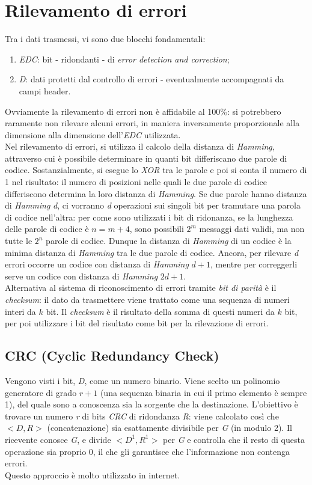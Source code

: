 \section{Rilevamento di errori}
Tra i dati trasmessi, vi sono due blocchi fondamentali:
\begin{enumerate}
	\item \textit{EDC}: bit - ridondanti - di \textit{error detection and correction};
	\item \textit{D}: dati protetti dal controllo di errori - eventualmente accompagnati da campi header.
\end{enumerate}
Ovviamente la rilevamento di errori non è affidabile al 100\%: si potrebbero raramente non rilevare alcuni errori, in maniera inversamente proporzionale alla dimensione alla dimensione dell'\textit{EDC} utilizzata. \\
Nel rilevamento di errori, si utilizza il calcolo della distanza di \textit{Hamming}, attraverso cui è possibile determinare in quanti bit differiscano due parole di codice. Sostanzialmente, si esegue lo \textit{XOR} tra le parole e poi si conta il numero di 1 nel risultato: il numero di posizioni nelle quali le due parole di codice differiscono determina la loro distanza di \textit{Hamming}. Se due parole hanno distanza di \textit{Hamming} \textit{d}, ci vorranno \textit{d} operazioni sui singoli bit per tramutare una parola di codice nell'altra: per come sono utilizzati i bit di ridonanza, se la lunghezza delle parole di codice è $n=m+4$, sono possibili $2^m$ messaggi dati validi, ma non tutte le $2^n$ parole di codice. Dunque la distanza di \textit{Hamming} di un codice è la minima distanza di \textit{Hamming} tra le due parole di codice. Ancora, per rilevare \textit{d} errori occorre un codice con distanza di \textit{Hamming} $d+1$, mentre per correggerli serve un codice con distanza di \textit{Hamming} $2d+1$. \\
Alternativa al sistema di riconoscimento di errori tramite \textit{bit di parità} è il \textit{checksum}: il dato da trasmettere viene trattato come una sequenza di numeri interi da $k$ bit. Il \textit{checksum} è il risultato della somma di questi numeri da $k$ bit, per poi utilizzare i bit del risultato come bit per la rilevazione di errori.

\subsection{CRC (Cyclic Redundancy Check)}
Vengono visti i bit, \textit{D}, come un numero binario. Viene scelto un polinomio generatore di grado $r+1$ (una sequenza binaria in cui il primo elemento è sempre 1), del quale sono a conoscenza sia la sorgente che la destinazione. L'obiettivo è trovare un numero \textit{r} di bits \textit{CRC} di ridondanza \textit{R}: viene calcolato così che $<D,R>$ (concatenazione) sia esattamente divisibile per \textit{G} (in modulo 2). Il ricevente conosce \textit{G}, e divide $<D^1,R^1>$ per \textit{G} e controlla che il resto di questa operazione sia proprio 0, il che gli garantisce che l'informazione non contenga errori. \\
Questo approccio è molto utilizzato in internet.

